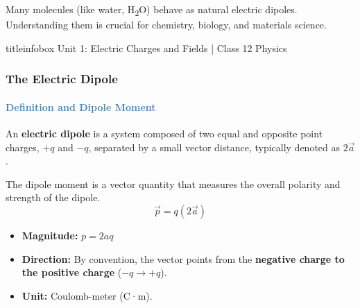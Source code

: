 \begin{frame}
\begin{frame}
\vspace{0.5cm}

\begin{importantbox}
\vspace{0.1cm}
Many molecules (like water, H\textsubscript{2}O) behave as natural electric dipoles. Understanding them is crucial for chemistry, biology, and materials science.
\vspace{0.1cm}
\end{importantbox}

\vfill

\begin{beamercolorbox}[wd=\textwidth,ht=0.5cm,dp=0.1cm,center]{titleinfobox}
    \small\color{coolgray} Unit 1: Electric Charges and Fields | Class 12 Physics
\end{beamercolorbox}
\end{frame}

\begin{frame}
\frametitle{\textsf{\textbf{The Electric Dipole}}}
\framesubtitle{\textcolor{steelblue}{Definition and Dipole Moment}}

\begin{keybox}
\vspace{0.1cm}
An \textbf{electric dipole} is a system composed of two equal and opposite point charges, $+q$ and $-q$, separated by a small vector distance, typically denoted as $2\vec{a}$.
\vspace{0.1cm}
\end{keybox}

\vspace{0.3cm}

\begin{formulabox}
\vspace{0.1cm}
The dipole moment is a vector quantity that measures the overall polarity and strength of the dipole.
\begin{equation*}
\boxed{\vec{p} = q(2\vec{a})}
\end{equation*}
\begin{itemize}
    \item \textbf{Magnitude:} $p = 2aq$
    \item \textbf{Direction:} By convention, the vector points from the \textbf{negative charge to the positive charge} ($-q \to +q$).
    \item \textbf{Unit:} Coulomb-meter (C·m).
\end{itemize}
\vspace{0.1cm}
\end{formulabox}


\end{frame}
\end{frame}
